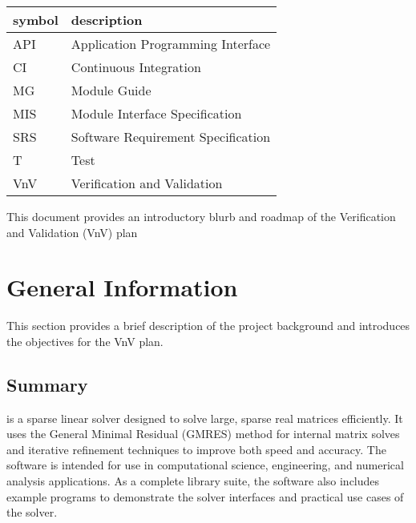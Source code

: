 \documentclass[12pt, titlepage]{article}
\begin{document}
\renewcommand{\arraystretch}{1.2}
\begin{tabular}{l l}
  \toprule
  \textbf{symbol} & \textbf{description}                     \\
  \midrule
  API       & Application Programming Interface  \\
  CI        & Continuous Integration             \\
  MG        & Module Guide                       \\
  MIS       & Module Interface Specification     \\
  SRS       & Software Requirement Specification \\
  T         & Test                               \\
  VnV       & Verification and Validation        \\
  \bottomrule
\end{tabular}



\newpage


This document provides an introductory blurb and roadmap of the Verification and
Validation (VnV) plan

\section{General Information}

This section provides a brief description of the project background and
introduces the objectives for the VnV plan.

\subsection{Summary}


\progname{} is a sparse linear solver designed to solve large, sparse real
matrices efficiently. It uses the General Minimal Residual (GMRES) method for
internal matrix solves and iterative refinement techniques to improve both speed
and accuracy. The software is intended for use in computational science,
engineering, and numerical analysis applications. As a complete library suite,
the software also includes example programs to demonstrate the solver interfaces
and practical use cases of the solver.
\end{document}
